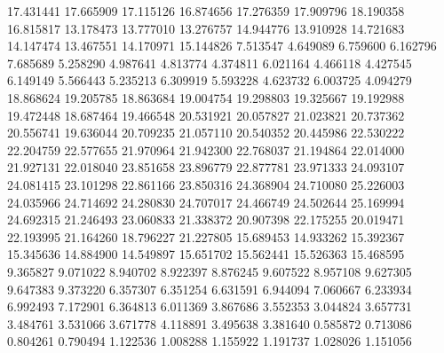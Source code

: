 17.431441
17.665909
17.115126
16.874656
17.276359
17.909796
18.190358
16.815817
13.178473
13.777010
13.276757
14.944776
13.910928
14.721683
14.147474
13.467551
14.170971
15.144826
7.513547
4.649089
6.759600
6.162796
7.685689
5.258290
4.987641
4.813774
4.374811
6.021164
4.466118
4.427545
6.149149
5.566443
5.235213
6.309919
5.593228
4.623732
6.003725
4.094279
18.868624
19.205785
18.863684
19.004754
19.298803
19.325667
19.192988
19.472448
18.687464
19.466548
20.531921
20.057827
21.023821
20.737362
20.556741
19.636044
20.709235
21.057110
20.540352
20.445986
22.530222
22.204759
22.577655
21.970964
21.942300
22.768037
21.194864
22.014000
21.927131
22.018040
23.851658
23.896779
22.877781
23.971333
24.093107
24.081415
23.101298
22.861166
23.850316
24.368904
24.710080
25.226003
24.035966
24.714692
24.280830
24.707017
24.466749
24.502644
25.169994
24.692315
21.246493
23.060833
21.338372
20.907398
22.175255
20.019471
22.193995
21.164260
18.796227
21.227805
15.689453
14.933262
15.392367
15.345636
14.884900
14.549897
15.651702
15.562441
15.526363
15.468595
9.365827
9.071022
8.940702
8.922397
8.876245
9.607522
8.957108
9.627305
9.647383
9.373220
6.357307
6.351254
6.631591
6.944094
7.060667
6.233934
6.992493
7.172901
6.364813
6.011369
3.867686
3.552353
3.044824
3.657731
3.484761
3.531066
3.671778
4.118891
3.495638
3.381640
0.585872
0.713086
0.804261
0.790494
1.122536
1.008288
1.155922
1.191737
1.028026
1.151056
